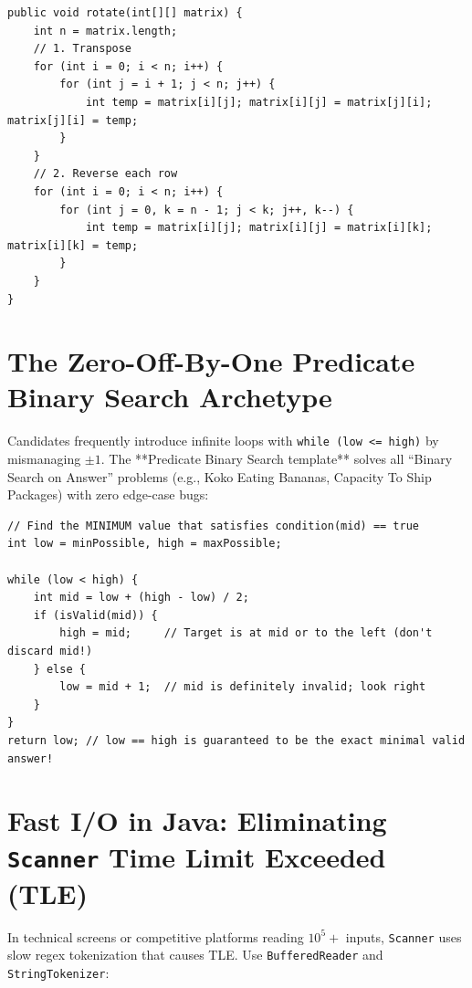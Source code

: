 \documentclass[10pt,journal,compsoc,onecolumn]{IEEEtran}
\begin{document}
\begin{verbatim}
public void rotate(int[][] matrix) {
    int n = matrix.length;
    // 1. Transpose
    for (int i = 0; i < n; i++) {
        for (int j = i + 1; j < n; j++) {
            int temp = matrix[i][j]; matrix[i][j] = matrix[j][i]; matrix[j][i] = temp;
        }
    }
    // 2. Reverse each row
    for (int i = 0; i < n; i++) {
        for (int j = 0, k = n - 1; j < k; j++, k--) {
            int temp = matrix[i][j]; matrix[i][j] = matrix[i][k]; matrix[i][k] = temp;
        }
    }
}
\end{verbatim}

\section{The Zero-Off-By-One Predicate Binary Search Archetype}
\label{sec:binary_search_predicate}

Candidates frequently introduce infinite loops with \texttt{while (low <= high)} by mismanaging $\pm 1$. The **Predicate Binary Search template** solves all ``Binary Search on Answer'' problems (e.g., Koko Eating Bananas, Capacity To Ship Packages) with zero edge-case bugs:

\begin{verbatim}
// Find the MINIMUM value that satisfies condition(mid) == true
int low = minPossible, high = maxPossible;

while (low < high) {
    int mid = low + (high - low) / 2;
    if (isValid(mid)) {
        high = mid;     // Target is at mid or to the left (don't discard mid!)
    } else {
        low = mid + 1;  // mid is definitely invalid; look right
    }
}
return low; // low == high is guaranteed to be the exact minimal valid answer!
\end{verbatim}

\section{Fast I/O in Java: Eliminating \texttt{Scanner} Time Limit Exceeded (TLE)}
\label{sec:fast_io}

In technical screens or competitive platforms reading $10^5+$ inputs, \texttt{Scanner} uses slow regex tokenization that causes TLE. Use \texttt{BufferedReader} and \texttt{StringTokenizer}:
\end{document}
